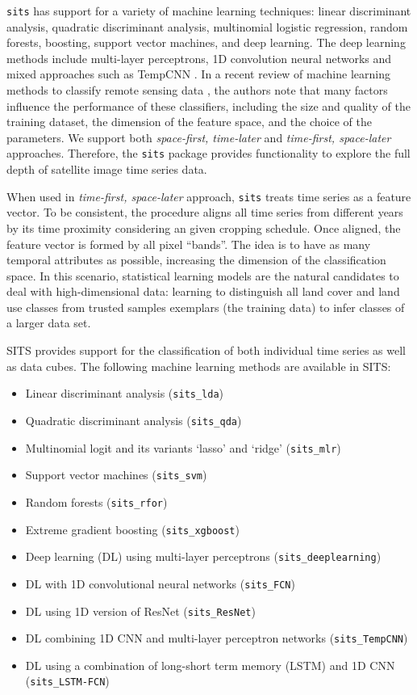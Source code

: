 \documentclass[a4paper,]{tufte-book}
\providecommand{\tightlist}{%
  \setlength{\itemsep}{0pt}\setlength{\parskip}{0pt}}
\begin{document}
\texttt{sits} has support for a variety of machine learning techniques: linear discriminant analysis, quadratic discriminant analysis, multinomial logistic regression, random forests, boosting, support vector machines, and deep learning. The deep learning methods include multi-layer perceptrons, 1D convolution neural networks and mixed approaches such as TempCNN \citep{Pelletier2019} . In a recent review of machine learning methods to classify remote sensing data \citep{Maxwell2018}, the authors note that many factors influence the performance of these classifiers, including the size and quality of the training dataset, the dimension of the feature space, and the choice of the parameters. We support both \emph{space-first, time-later} and \emph{time-first, space-later} approaches. Therefore, the \texttt{sits} package provides functionality to explore the full depth of satellite image time series data.

When used in \emph{time-first, space-later} approach, \texttt{sits} treats time series as a feature vector. To be consistent, the procedure aligns all time series from different years by its time proximity considering an given cropping schedule. Once aligned, the feature vector is formed by all pixel ``bands''. The idea is to have as many temporal attributes as possible, increasing the dimension of the classification space. In this scenario, statistical learning models are the natural candidates to deal with high-dimensional data: learning to distinguish all land cover and land use classes from trusted samples exemplars (the training data) to infer classes of a larger data set.

SITS provides support for the classification of both individual time series as well as data cubes. The following machine learning methods are available in SITS:

\begin{itemize}
\tightlist
\item
  Linear discriminant analysis (\texttt{sits\_lda})
\item
  Quadratic discriminant analysis (\texttt{sits\_qda})
\item
  Multinomial logit and its variants `lasso' and `ridge' (\texttt{sits\_mlr})
\item
  Support vector machines (\texttt{sits\_svm})
\item
  Random forests (\texttt{sits\_rfor})
\item
  Extreme gradient boosting (\texttt{sits\_xgboost})
\item
  Deep learning (DL) using multi-layer perceptrons (\texttt{sits\_deeplearning})
\item
  DL with 1D convolutional neural networks (\texttt{sits\_FCN})
\item
  DL using 1D version of ResNet (\texttt{sits\_ResNet})
\item
  DL combining 1D CNN and multi-layer perceptron networks (\texttt{sits\_TempCNN})
\item
  DL using a combination of long-short term memory (LSTM) and 1D CNN (\texttt{sits\_LSTM-FCN})
\end{itemize}
\end{document}
